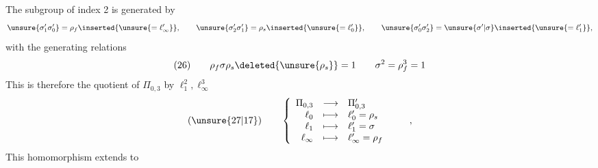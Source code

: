 The subgroup  of index 2  is generated by
\[
\unsure{\sigma_1'\sigma_0'}=\rho_f\inserted{\unsure{=\ell_\infty'}},\qquad
\unsure{\sigma_2'\sigma_1'}=\rho_s\inserted{\unsure{=\ell_0'}},\qquad
\unsure{\sigma_0'\sigma_2'}=\unsure{\sigma'|\sigma}\inserted{\unsure{=\ell_1'}},
\]
with the generating relations
\[
(26)\qquad
\rho_f\sigma\rho_s\deleted{\unsure{\rho_s}}=1
\qquad
\sigma^2=\rho_f^3=1
\]
This is therefore the quotient of $\Pi_{0,3}$ by $\ell_1^2,\ell_\infty^3$
\[
(\unsure{27|17})\qquad
\left\{\begin{array}{rcl}
\Pi_{0,3}&\longrightarrow&\Pi_{0,3}'\\
\ell_0&\longmapsto&\ell_0'=\rho_s\\
\ell_1&\longmapsto&\ell_1'=\sigma\\
\ell_\infty&\longmapsto&\ell_\infty'=\rho_f
\end{array}\right.
\qquad,
\]
 This homomorphism extends to


